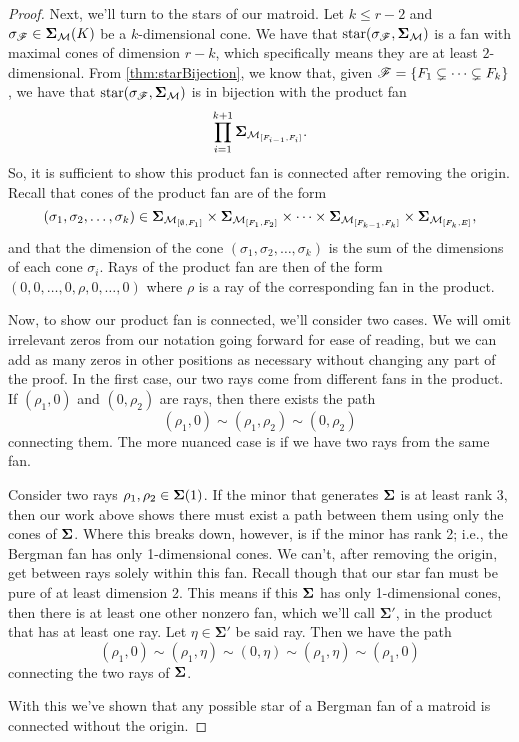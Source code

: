 \documentclass[12pt,oneside]{../../sfsuthesis}
\begin{document}
\begin{proof}
    Next, we'll turn to the stars of our matroid.
    Let \( k \leq r - 2 \) and \( \sigma_{\mathscr{F}} \in {\bm{\Sigma}}_{\mathcal{M}}(K) \) be a \( k \)-dimensional cone.
    We have that \( \operatorname{star}( \sigma_{\mathscr{F}}, {\bm{\Sigma}}_{\mathcal{M}}) \) is a fan with maximal cones of dimension \( r - k \), which specifically means they are at least \( 2 \)-dimensional.
    From \th\ref{thm:starBijection}, we know that, given \( \mathscr{F} = \{ F_1 \subsetneq \cdots \subsetneq F_k \} \), we have that \( \operatorname{star}( \sigma_{\mathscr{F}}, {\bm{\Sigma}}_{\mathcal{M}}) \) is in bijection with the product fan
    \[
        \prod_{i = 1}^{k+1} {\bm{\Sigma}}_{\mathcal{M}_{[F_{i-1}, F_i]}}.
    \]
    So, it is sufficient to show this product fan is connected after removing the origin.
    Recall that cones of the product fan are of the form
    \[
        (\sigma_1, \sigma_2, \dots, \sigma_k) \in {\bm{\Sigma}}_{\mathcal{M}_{[\emptyset, F_1]}} \times {\bm{\Sigma}}_{\mathcal{M}_{[F_{1}, F_2]}} \times \cdots \times {\bm{\Sigma}}_{\mathcal{M}_{[F_{k-1}, F_k]}} \times {\bm{\Sigma}}_{\mathcal{M}_{[F_{k}, E]}},
    \]
    and that the dimension of the cone \( (\sigma_1, \sigma_2, \dots, \sigma_k) \) is the sum of the dimensions of each cone \( \sigma_i \).
    Rays of the product fan are then of the form \( (0, 0, \dots, 0,  \rho, 0, \dots, 0) \) where \( \rho \) is a ray of the corresponding fan in the product.

    Now, to show our product fan is connected, we'll consider two cases.
    We will omit irrelevant zeros from our notation going forward for ease of reading, but we can add as many zeros in other positions as necessary without changing any part of the proof.
    In the first case, our two rays come from different fans in the product.
    If \( (\rho_1, 0) \) and \( (0, \rho_2) \) are rays, then there exists the path
    \[
        (\rho_1, 0) \sim (\rho_1, \rho_2) \sim (0, \rho_2)
    \]
    connecting them.
    The more nuanced case is if we have two rays from the same fan.

    Consider two rays \( \rho_1, \rho_2 \in {\bm{\Sigma}}(1)\).
    If the minor that generates \( {\bm{\Sigma}} \) is at least rank 3, then our work above shows there must exist a path between them using only the cones of \( {\bm{\Sigma}} \).
    Where this breaks down, however, is if the minor has rank 2; i.e., the Bergman fan has only 1-dimensional cones.
    We can't, after removing the origin, get between rays solely within this fan.
    Recall though that our star fan must be pure of at least dimension 2.
    This means if this \({\bm{\Sigma}} \) has only 1-dimensional cones, then there is at least one other nonzero fan, which we'll call \( \bm{\Sigma'} \), in the product that has at least one ray.
    Let \( \eta \in  \bm{\Sigma'} \) be said ray.
    Then we have the path
    \[
        (\rho_1, 0) \sim (\rho_1, \eta) \sim (0, \eta) \sim (\rho_1, \eta) \sim (\rho_1, 0)
    \]
    connecting the two rays of \( {\bm{\Sigma}} \).

    With this we've shown that any possible star of a Bergman fan of a matroid is connected without the origin.
\end{proof}
\end{document}
